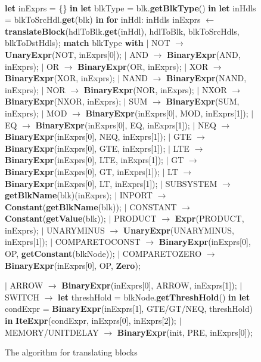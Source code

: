 \documentclass{article}
\begin{document}
\begin{figure}
\begin{algorithmic}
\\
\State \textbf{let} inExprs = \{\} \textbf{in}
\State \textbf{let} blkType = blk.\textbf{getBlkType}() \textbf{in}
\State \textbf{let} inHdls = blkToSrcHdl.\textbf{get}(blk) \textbf{in}
\State \textbf{for} inHdl: inHdls
\State {\ \ \ \ } inExprs $\leftarrow$ \textbf{translateBlock}(hdlToBlk.\textbf{get}(inHdl), hdlToBlk, blkToSrcHdls, blkToDstHdls);
\State \textbf{match} blkType \textbf{with}
\State $\mid$ NOT $\rightarrow$ \textbf{UnaryExpr}(NOT, inExprs[0]);
\State $\mid$ AND $\rightarrow$ \textbf{BinaryExpr}(AND, inExprs);
\State $\mid$ OR $\rightarrow$ \textbf{BinaryExpr}(OR, inExprs);
\State $\mid$ XOR $\rightarrow$ \textbf{BinaryExpr}(XOR, inExprs);
\State $\mid$ NAND $\rightarrow$ \textbf{BinaryExpr}(NAND, inExprs);
\State $\mid$ NOR $\rightarrow$ \textbf{BinaryExpr}(NOR, inExprs);
\State $\mid$ NXOR $\rightarrow$ \textbf{BinaryExpr}(NXOR, inExprs);
\State $\mid$ SUM $\rightarrow$ \textbf{BinaryExpr}(SUM, inExprs);
\State $\mid$ MOD $\rightarrow$ \textbf{BinaryExpr}(inExprs[0], MOD, inExprs[1]);
\State $\mid$ EQ $\rightarrow$ \textbf{BinaryExpr}(inExprs[0], EQ, inExprs[1]);
\State $\mid$ NEQ $\rightarrow$ \textbf{BinaryExpr}(inExprs[0], NEQ, inExprs[1]);
\State $\mid$ GTE $\rightarrow$ \textbf{BinaryExpr}(inExprs[0], GTE, inExprs[1]);
\State $\mid$ LTE $\rightarrow$ \textbf{BinaryExpr}(inExprs[0], LTE, inExprs[1]);
\State $\mid$ GT $\rightarrow$ \textbf{BinaryExpr}(inExprs[0], GT, inExprs[1]);
\State $\mid$ LT $\rightarrow$ \textbf{BinaryExpr}(inExprs[0], LT, inExprs[1]);
\State $\mid$ SUBSYSTEM $\rightarrow$ \textbf{getBlkName}(blk)(inExprs);
\State $\mid$ INPORT $\rightarrow$ \textbf{Constant}(\textbf{getBlkName}(blk));
\State $\mid$ CONSTANT $\rightarrow$ \textbf{Constant}(\textbf{getValue}(blk));
\State $\mid$ PRODUCT $\rightarrow$ \textbf{Expr}(PRODUCT, inExprs);
\State $\mid$ UNARYMINUS $\rightarrow$ \textbf{UnaryExpr}(UNARYMINUS, inExprs[1]);
\State $\mid$ COMPARETOCONST $\rightarrow$ \textbf{BinaryExpr}(inExprs[0], OP, \textbf{getConstant}(blkNode));
\State $\mid$ COMPARETOZERO $\rightarrow$ \textbf{BinaryExpr}(inExprs[0], OP, \textbf{Zero});

\State $\mid$ ARROW $\rightarrow$ \textbf{BinaryExpr}(inExprs[0], ARROW, inExprs[1]);
\State $\mid$ SWITCH $\rightarrow$  \textbf{let} threshHold = blkNode.\textbf{getThreshHold}() \textbf{in}
\State {\ \ \ \ \ \ \ \ \ \ \ \ \ \ \ \ \ \ } \textbf{let} condExpr = \textbf{BinaryExpr}(inExprs[1], GTE/GT/NEQ, threshHold) \textbf{in}
\State {\ \ \ \ \ \ \ \ \ \ \ \ \ \ \ \ \ \ } \textbf{IteExpr}(condExpr, inExprs[0], inExprs[2]);
\State $\mid$ MEMORY/UNITDELAY $\rightarrow$ \textbf{BinaryExpr}(init, PRE, inExprs[0]);
\EndFunction
\end{algorithmic}
\label{translateblock}
\caption{The algorithm for translating blocks}
\end{figure}
\end{document}
